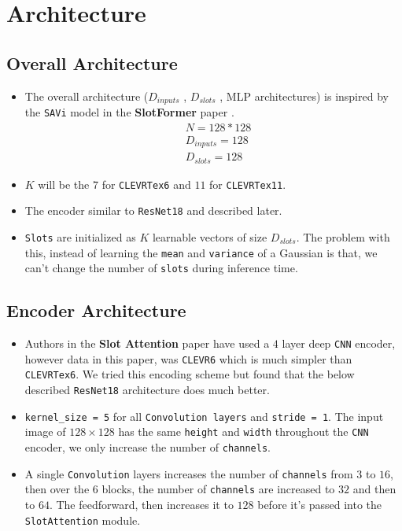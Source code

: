 \section{Architecture}
\subsection{Overall Architecture}
\begin{itemize}
    \item The overall architecture ($D_{inputs}$ , $D_{slots}$ , MLP architectures) is inspired by the \verb|SAVi| model in the \textbf{SlotFormer} paper \cite{slot_former}. 
    \begin{align*}
    &N = 128 * 128\\
    &D_{inputs} = 128\\
    &D_{slots} = 128
    \end{align*}

    
    \item $K$ will be the $7$ for \verb|CLEVRTex6| and $11$ for \verb|CLEVRTex11|. 
    
    \item The encoder similar to \verb|ResNet18| and described later. 

    \item \verb|Slots| are initialized as $K$ learnable vectors of size $D_{slots}$. The problem with this, instead of learning the \verb|mean| and \verb|variance| of a Gaussian is that, we can't change the number of \verb|slots| during inference time. 
\end{itemize}

\subsection{Encoder Architecture}
\begin{itemize}
    \item Authors in the \textbf{Slot Attention} paper \cite{slot_attention} have used a $4$ layer deep \verb|CNN| encoder, however data in this paper, was \verb|CLEVR6| which is much simpler than \verb|CLEVRTex6|. We tried this encoding scheme but found that the below described \verb|ResNet18| architecture does much better.

    \item \verb|kernel_size = 5| for all \verb|Convolution layers| and \verb|stride = 1|. The input image of $128 \times 128$ has the same \verb|height| and \verb|width| throughout the \verb|CNN| encoder, we only increase the number of \verb|channels|.

    \item A single \verb|Convolution| layers increases the number of \verb|channels| from $3$ to $16$, then over the $6$ blocks, the number of \verb|channels| are increased to $32$ and then to $64$. The feedforward, then increases it to $128$ before it's passed into the \verb|SlotAttention| module.
\end{itemize}